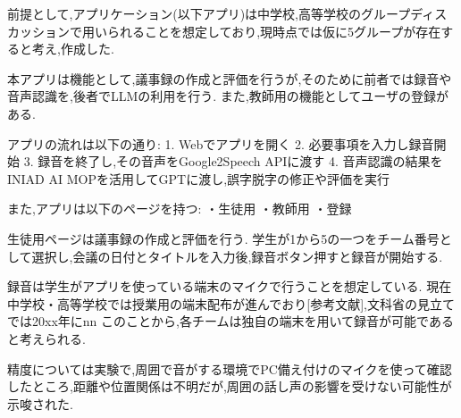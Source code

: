 前提として,アプリケーション(以下アプリ)は中学校,高等学校のグループディスカッションで用いられることを想定しており,現時点では仮に5グループが存在すると考え,作成した.

本アプリは機能として,議事録の作成と評価を行うが,そのために前者では録音や音声認識を,後者でLLMの利用を行う.
また,教師用の機能としてユーザの登録がある.

アプリの流れは以下の通り:
1. Webでアプリを開く
2. 必要事項を入力し録音開始
3. 録音を終了し,その音声をGoogle2Speech APIに渡す
4. 音声認識の結果をINIAD AI MOPを活用してGPTに渡し,誤字脱字の修正や評価を実行


また,アプリは以下のページを持つ:
・生徒用
・教師用
・登録

生徒用ページは議事録の作成と評価を行う.
学生が1から5の一つをチーム番号として選択し,会議の日付とタイトルを入力後,録音ボタン押すと録音が開始する.

録音は学生がアプリを使っている端末のマイクで行うことを想定している.
現在中学校・高等学校では授業用の端末配布が進んでおり[参考文献],文科省の見立てでは20xx年にnn%
このことから,各チームは独自の端末を用いて録音が可能であると考えられる.

精度については実験で,周囲で音がする環境でPC備え付けのマイクを使って確認したところ,距離や位置関係は不明だが,周囲の話し声の影響を受けない可能性が示唆された.
